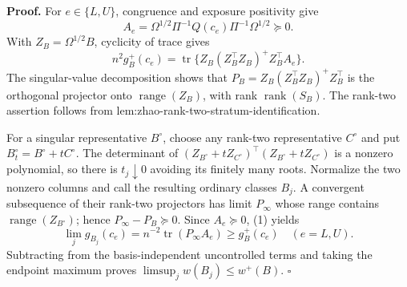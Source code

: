 \textbf{Proof.}
For \(e\in\{L,U\}\), congruence and exposure positivity give
\[
A_e=\Omega^{1/2}\Pi^{-1}Q(c_e)\Pi^{-1}\Omega^{1/2}\succeq0.
\]
With \(Z_B=\Omega^{1/2}B\), cyclicity of trace gives
\[
n^2g_B^+(c_e)
=\operatorname{tr}\{Z_B(Z_B^\top Z_B)^+Z_B^\top A_e\}.
\tag{1}
\]
The singular-value decomposition shows that \(P_B=Z_B(Z_B^\top Z_B)^+Z_B^\top\) is the orthogonal projector onto \(\operatorname{range}(Z_B)\), with rank \(\operatorname{rank}(S_B)\).  The rank-two assertion follows from lem:zhao-rank-two-stratum-identification.

For a singular representative \(B^\circ\), choose any rank-two representative \(C^\circ\) and put \(B_t^\circ=B^\circ+tC^\circ\).  The determinant of \((Z_{B^\circ}+tZ_{C^\circ})^\top(Z_{B^\circ}+tZ_{C^\circ})\) is a nonzero polynomial, so there is \(t_j\downarrow0\) avoiding its finitely many roots.  Normalize the two nonzero columns and call the resulting ordinary classes \(B_j\).  A convergent subsequence of their rank-two projectors has limit \(P_\infty\) whose range contains \(\operatorname{range}(Z_{B^\circ})\); hence \(P_\infty-P_B\succeq0\).  Since \(A_e\succeq0\), (1) yields
\[
\lim_jg_{B_j}(c_e)=n^{-2}\operatorname{tr}(P_\infty A_e)
\ge g_B^+(c_e)
\quad(e=L,U).
\]
Subtracting from the basis-independent uncontrolled terms and taking the endpoint maximum proves \(\limsup_jw(B_j)\le w^+(B)\). \(\square\)